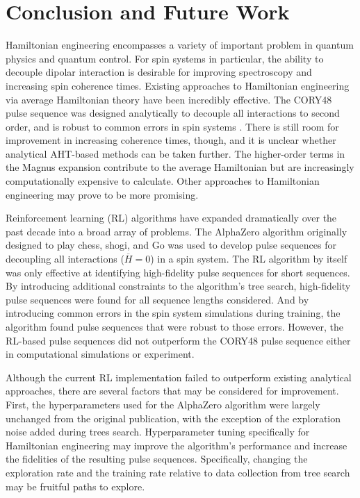 \chapter{Conclusion and Future Work}

Hamiltonian engineering encompasses a variety of important problem in quantum physics and quantum control. For spin systems in particular, the ability to decouple dipolar interaction is desirable for improving spectroscopy and increasing spin coherence times.
Existing approaches to Hamiltonian engineering via average Hamiltonian theory have been incredibly effective. The CORY48 pulse sequence was designed analytically to decouple all interactions to second order, and is robust to common errors in spin systems \cite{CORY1990205}. There is still room for improvement in increasing coherence times, though, and it is unclear whether analytical AHT-based methods can be taken further. The higher-order terms in the Magnus expansion contribute to the average Hamiltonian but are increasingly computationally expensive to calculate. Other approaches to Hamiltonian engineering may prove to be more promising.

Reinforcement learning (RL) algorithms have expanded dramatically over the past decade into a broad array of problems. The AlphaZero algorithm originally designed to play chess, shogi, and Go was used to develop pulse sequences for decoupling all interactions ($\overline{H} = 0$) in a spin system. The RL algorithm by itself was only effective at identifying high-fidelity pulse sequences for short sequences. By introducing additional constraints to the algorithm's tree search, high-fidelity pulse sequences were found for all sequence lengths considered. And by introducing common errors in the spin system simulations during training, the algorithm found pulse sequences that were robust to those errors. However, the RL-based pulse sequences did not outperform the CORY48 pulse sequence either in computational simulations or experiment.


Although the current RL implementation failed to outperform existing analytical approaches, there are several factors that may be considered for improvement.
First, the hyperparameters used for the AlphaZero algorithm were largely unchanged from the original publication, with the exception of the exploration noise added during trees search. Hyperparameter tuning specifically for Hamiltonian engineering may improve the algorithm's performance and increase the fidelities of the resulting pulse sequences. Specifically, changing the exploration rate and the training rate relative to data collection from tree search may be fruitful paths to explore.

